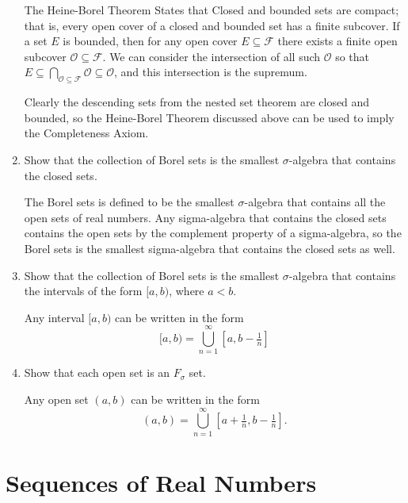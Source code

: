 \documentclass[a4paper,10pt]{book}
\theoremstyle{plain} %
\begin{document}
\begin{enumerate}
	The Heine-Borel Theorem States that Closed and bounded sets are compact; that is, every open cover of a closed and bounded set has a finite subcover.
	If a set $E$ is bounded, then for any open cover $E \subseteq \mathcal{F}$ there exists a finite open subcover $\mathcal{O} \subseteq \mathcal{F}$. 
	We can consider the intersection of all such $\mathcal{O}$ so that $E \subseteq \bigcap_{\mathcal{O} \subseteq \mathcal{F}} \mathcal{O} \subseteq \mathcal{O}$, and this intersection is the supremum. 
	\par
	Clearly the descending sets from the nested set theorem are closed and bounded, so the Heine-Borel Theorem discussed above can be used to imply the Completeness Axiom.
	\item Show that the collection of Borel sets is the smallest $\sigma$-algebra that contains the closed sets.\par
	The Borel sets is defined to be the smallest $\sigma$-algebra that contains all the open sets of real numbers.
	Any sigma-algebra that contains the closed sets contains the open sets by the complement property of a sigma-algebra, so the Borel sets is the smallest sigma-algebra that contains the closed sets as well. 
	\item Show that the collection of Borel sets is the smallest $\sigma$-algebra that contains the intervals of the form $[a,b)$, where $a<b.$\par
	Any interval $[a,b)$ can be written in the form
	\[
	[a,b) = \bigcup_{n=1}^\infty [a,b-\tfrac{1}{n}]	
	\] 
	\item Show that each open set is an $F_{\sigma}$ set.\par
	Any open set $(a,b)$ can be written in the form
	\[
		(a,b) = \bigcup_{n=1}^\infty [a+\tfrac{1}{n},b-\tfrac{1}{n}].	
	\] 
\end{enumerate}

\section{Sequences of Real Numbers}
\end{document}
